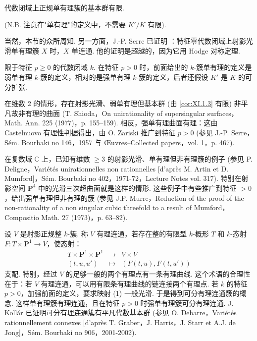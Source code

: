 \begin{corollary}\label{cor:XI.1.3}
代数闭域上正规单有理簇的基本群有限.
\end{corollary}

(N.B. 注意在"单有理"的定义中，不需要 $K'/K$ 有限).

\begin{remark}\label{rem:XI.1.4}
当然，本节的众所周知. 另一方面，J.-P. Serre 已证明 \cite{exp11-10}：特征零代数闭域上射影光滑单有理簇 $X$ 时，$X$ 单连通. 他的证明是超越的，因为它用 Hodge 对称定理.

\begin{remark}[2003 年 (MR) 增补]
限于特征 $p \geqslant 0$ 的代数闭域 $k$. 在特征 $p > 0$ 时，前面给出的 $k$-簇单有理的定义是弱单有理 $k$-簇的定义，相对的是强单有理 $k$-簇的定义，后者还假设 $K'$ 是 $K$ 的可分扩张.

在维数 2 的情形，存在射影光滑、弱单有理但基本群 (由 \ref{cor:XI.1.3} 有限) 非平凡故非有理的曲面 (T. Shioda，On unirationality of supersingular surfaces，Math. Ann. 225 (1977)，p. 155--159). 相反，强单有理曲面有理：这由 Castelnuovo 有理性判据得出，由 O. Zariski 推广到特征 $p > 0$ (参见 J.-P. Serre，S\'em. Bourbaki no 146，1957 与 \OE uvres--Collected papers，vol. 1，p. 467).

在复数域 $\mathbb{C}$ 上，已知有维数 $\geqslant 3$ 的射影光滑、单有理但非有理簇的例子 (参见 P. Deligne，Vari\'et\'es unirationnelles non rationnelles [d'apr\`es M. Artin et D. Mumford]，S\'em. Bourbaki no 402，1971-72，Lecture Notes vol. 317). 特别在射影空间 $\mathbf{P}^4$ 中的光滑三次超曲面就是这样的情形. 这些例子中有些推广到特征 $> 0$，给出强单有理但非有理的簇 (参见 J.P. Murre，Reduction of the proof of the non-rationality of a non singular cubic threefold to a result of Mumford，Compositio Math. 27 (1973)，p. 63--82).

设 $V$ 是射影正规整 $k$-簇. 称 $V$ 有理连通，若存在整的有限型 $k$-概形 $T$ 和 $k$-态射 $F \colon T \times \mathbf{P}^1 \to V$，使态射：
\begin{equation}
\begin{array}{ccc}
T \times \mathbf{P}^1 \times \mathbf{P}^1 & \longrightarrow & V \times V \\
(t, u, u') & \longmapsto & (F(t, u), F(t, u'))
\end{array}
\tag{1}
\label{eq:XI.1}
\end{equation}
支配. 特别，经过 $V$ 的足够一般的两个有理点有一条有理曲线. 这个术语的合理性在于：若 $V$ 有理连通，可以用有限条有理曲线的链连接两个有理点. 若 $k$ 的特征 $p > 0$，加强前面的定义，要求映射 (1) 一般光滑. 于是得到可分有理连通簇的概念. 这样单有理簇有理连通，且在特征 $p > 0$ 时强单有理簇可分有理连通. J. Koll\'ar 已证明可分有理连通簇有平凡代数基本群 (参见 O. Debarre，Vari\'et\'es rationnellement connexes [d'apr\`es T. Graber，J. Harris，J. Starr et A.J. de Jong]，S\'em. Bourbaki no 906，2001-2002).
\end{remark}
\end{remark}

